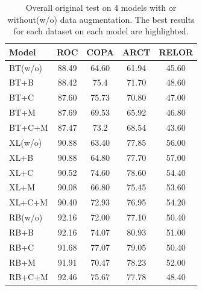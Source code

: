 \begin{table}[th]
    \scriptsize
    \centering
        \begin{tabular}{l|c|c|c|c} \toprule
            \textbf{Model} &\bf{ROC} &\bf{COPA} & \bf{ARCT} & \bf{RELOR} \\ \midrule
BT(w/o)&88.49&64.60&61.94&45.60\\
BT+B&88.42&75.4&71.70&48.60\\
BT+C&87.60&75.73&70.80&47.00\\
BT+M&87.69&69.53&65.92&46.80\\
BT+C+M&87.47&73.2&68.54&43.60\\
            \midrule
XL(w/o)&90.88&63.40&77.85&56.00\\
XL+B&90.88&64.80&77.70&57.00\\
XL+C&90.52&74.60 &78.60&54.40\\
XL+M&90.08&66.80&75.45&53.60\\
XL+C+M&90.40&72.93&76.95&54.20\\
            \midrule
RB(w/o)&92.16&72.00&77.10&50.40\\
RB+B&92.16&74.07&80.93&51.00\\
RB+C&91.68&77.07&79.05&50.40\\
RB+M&91.91&70.47&78.23&52.00\\
RB+C+M&92.46&75.67&77.78& 48.40\\
            \bottomrule
        \end{tabular}
    \caption{\label{tab:oriresults} Overall original test
        on 4 models with or without(w/o) data augmentation. The best results for each dataset on each model
are highlighted.}
\end{table}




